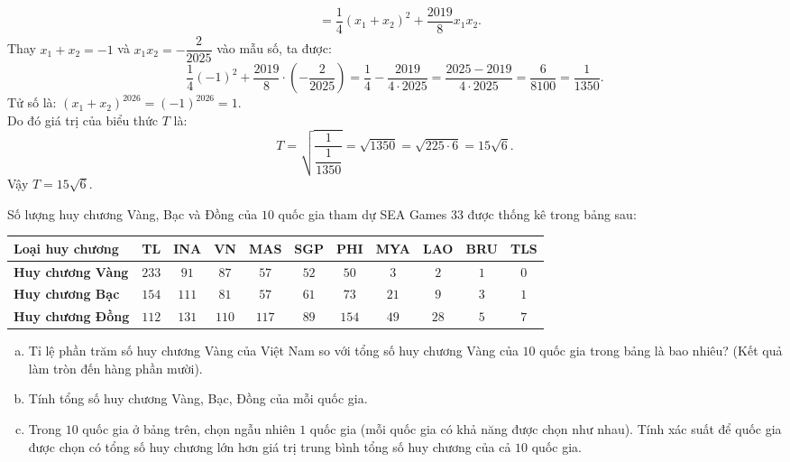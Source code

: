 \begin{bt}
{\begin{enumerate}[a)]
\begin{align*}
		&= \dfrac{1}{4}(x_1 + x_2)^2 + \dfrac{2019}{8}x_1 x_2.
	\end{align*}
	Thay $x_1 + x_2 = -1$ và $x_1 x_2 = -\dfrac{2}{2025}$ vào mẫu số, ta được:
	$$\dfrac{1}{4}(-1)^2 + \dfrac{2019}{8} \cdot \left(-\dfrac{2}{2025}\right) = \dfrac{1}{4} - \dfrac{2019}{4 \cdot 2025} = \dfrac{2025 - 2019}{4 \cdot 2025} = \dfrac{6}{8100} = \dfrac{1}{1350}.$$
	Tử số là: $(x_1 + x_2)^{2026} = (-1)^{2026} = 1$.\\
	Do đó giá trị của biểu thức $T$ là:
	$$T = \sqrt{\dfrac{1}{\dfrac{1}{1350}}} = \sqrt{1350} = \sqrt{225 \cdot 6} = 15\sqrt{6}.$$
	Vậy $T = 15\sqrt{6}$.
\end{enumerate}
}
\end{bt}

\begin{bt}%
Số lượng huy chương Vàng, Bạc và Đồng của $10$ quốc gia tham dự SEA Games 33 được thống kê trong bảng sau:
\begin{center}
	\begin{tabular}{|l|c|c|c|c|c|c|c|c|c|c|}
		\hline
		\textbf{Loại huy chương} & \textbf{TL} & \textbf{INA} & \textbf{VN} & \textbf{MAS} & \textbf{SGP} & \textbf{PHI} & \textbf{MYA} & \textbf{LAO} & \textbf{BRU} & \textbf{TLS} \\ \hline
		\textbf{Huy chương Vàng} & $233$ & $91$ & $87$ & $57$ & $52$ & $50$ & $3$ & $2$ & $1$ & $0$ \\ \hline
		\textbf{Huy chương Bạc} & $154$ & $111$ & $81$ & $57$ & $61$ & $73$ & $21$ & $9$ & $3$ & $1$ \\ \hline
		\textbf{Huy chương Đồng} & $112$ & $131$ & $110$ & $117$ & $89$ & $154$ & $49$ & $28$ & $5$ & $7$ \\ \hline
	\end{tabular}
\end{center}
\begin{enumerate}[a)]
	\item Tỉ lệ phần trăm số huy chương Vàng của Việt Nam so với tổng số huy chương Vàng của $10$ quốc gia trong bảng là bao nhiêu? (Kết quả làm tròn đến hàng phần mười).
	\item Tính tổng số huy chương Vàng, Bạc, Đồng của mỗi quốc gia.
	\item Trong $10$ quốc gia ở bảng trên, chọn ngẫu nhiên $1$ quốc gia (mỗi quốc gia có khả năng được chọn như nhau). Tính xác suất để quốc gia được chọn có tổng số huy chương lớn hơn giá trị trung bình tổng số huy chương của cả $10$ quốc gia.

\end{enumerate}
\end{bt}
